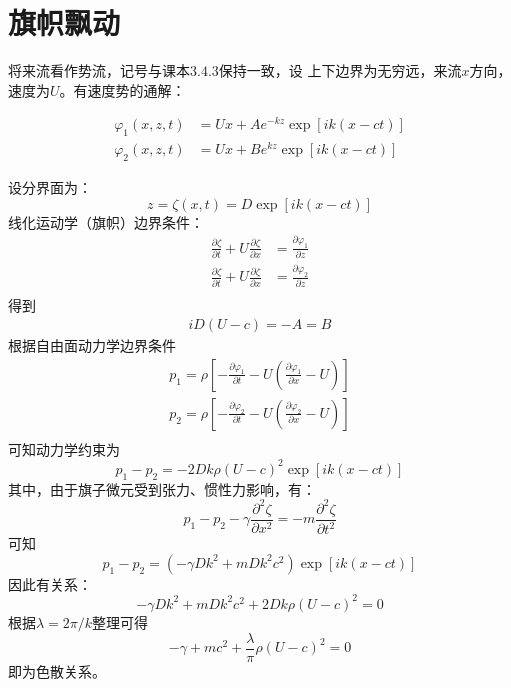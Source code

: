 \documentclass[UTF8,zihao=5]{ctexart} %
\newcommand*{\pd}[2]{\frac{\partial #1}{\partial #2}}
\begin{document}
\section{旗帜飘动}

将来流看作势流，记号与课本$3.4.3$保持一致，设
上下边界为无穷远，来流$x$方向，速度为$U$。有速度势的通解：

$$
    \begin{aligned}
        \varphi_1(x,z,t) & = Ux + Ae^{-kz}\exp{[ik(x-ct)]} \\
        \varphi_2(x,z,t) & = Ux + Be^{kz}\exp{[ik(x-ct)]}
    \end{aligned}
$$

设分界面为：
$$
    z=\zeta(x,t)=D\exp{[ik(x-ct)]}
$$
线化运动学（旗帜）边界条件：
$$
    \begin{aligned}
        \pd{\zeta}{t} + U\pd{\zeta}{x} & =\pd{\varphi_1}{z} \\
        \pd{\zeta}{t} + U\pd{\zeta}{x} & =\pd{\varphi_2}{z} \\
    \end{aligned}
$$
得到
$$
    \begin{aligned}
        iD(U-c)=-A=B
    \end{aligned}
$$
根据自由面动力学边界条件
$$
    \begin{aligned}
        p_1=\rho\left[-\pd{\varphi_1}{t}-U\left(\pd{\varphi_1}{x}-U\right)\right] \\
        p_2=\rho\left[-\pd{\varphi_2}{t}-U\left(\pd{\varphi_2}{x}-U\right)\right] \\
    \end{aligned}
$$
可知动力学约束为
$$
p_1-p_2=-2Dk\rho\left(
    U-c  
\right)^2
\exp{[ik(x-ct)]}
$$
其中，由于旗子微元受到张力、惯性力影响，有：
$$
p_1-p_2-\gamma\pd{^2\zeta}{x^2}=-m\pd{^2\zeta}{t^2}
$$
可知
$$
p_1-p_2=(-\gamma Dk^2 + mDk^2c^2)\exp{[ik(x-ct)]}
$$
因此有关系：
$$
-\gamma Dk^2 + mDk^2c^2 + 2Dk\rho\left(
    U-c  
\right)^2 = 0
$$
根据$\lambda=2\pi/k$整理可得
$$
-\gamma  + mc^2 + \frac{\lambda}{\pi}\rho\left(
    U-c  
\right)^2 = 0
$$
即为色散关系。




\end{document}
